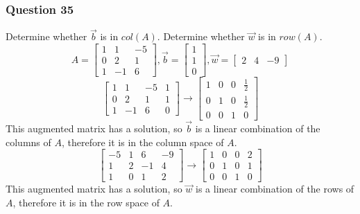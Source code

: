 \documentclass{math}
\begin{document}
\subsubsection*{Question 35}
Determine whether \( \vec{b} \) is in \( col(A) \). Determine whether
\( \vec{w} \) is in \( row(A) \).
\[ A = \begin{bmatrix}
  1 & 1 & -5 \\
  0 & 2 & 1 \\
  1 & -1 & 6
\end{bmatrix}, \vec{b} = \begin{bmatrix}
  1 \\ 1 \\ 0
\end{bmatrix}, \vec{w} = \begin{bmatrix}2 & 4 & -9\end{bmatrix} \]
\[ \begin{bmatrix}
  1 & 1 & -5 & 1 \\
  0 & 2 & 1 & 1 \\
  1 & -1 & 6 & 0
\end{bmatrix} \to \begin{bmatrix}
  1 & 0 & 0 & \frac{1}{2} \\
  0 & 1 & 0 & \frac{1}{2} \\
  0 & 0 & 1 & 0
\end{bmatrix} \]
This augmented matrix has a solution, so \( \vec{b} \) is a linear combination
of the columns of \( A \), therefore it is in the column space of \( A \).
\[ \begin{bmatrix}
  -5 & 1 & 6 & -9 \\
  1 & 2 & -1 & 4 \\
  1 & 0 & 1 & 2
\end{bmatrix} \to \begin{bmatrix}
  1 & 0 & 0 & 2 \\
  0 & 1 & 0 & 1 \\
  0 & 0 & 1 & 0
\end{bmatrix} \]
This augmented matrix has a solution, so \( \vec{w} \) is a linear combination
of the rows of \( A \), therefore it is in the row space of \( A \).
\end{document}
